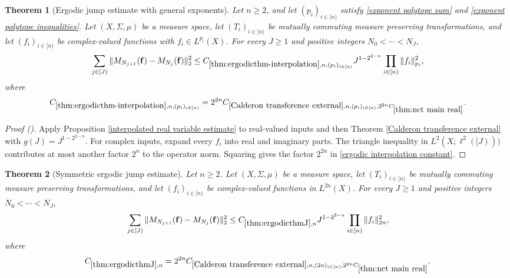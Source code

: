 \documentclass[12pt,reqno]{amsart}
\newcommand{\auto}{{({\tiny\faCar})}}
\theoremstyle{plain}
\newtheorem{theorem}{Theorem}[section]
\numberwithin{equation}{section}
\theoremstyle{remark}
\newcommand{\using}[1]{}
\begin{document}
\begin{theorem}[Ergodic jump estimate with general exponents]\label{thm:ergodicthm-interpolation}\using{interpolated real variable estimate}\using{Calderon transference external}
Let $n\ge2$, and let $(p_i)_{i\in[n)}$ satisfy \eqref{exponent polytope sum} and \eqref{exponent polytope inequalities}. Let $(X,\Sigma,\mu)$ be a measure space, let $(T_i)_{i\in[n)}$ be mutually commuting measure preserving transformations, and let $(f_i)_{i\in[n)}$ be complex-valued functions with $f_i\in L^{p_i}(X)$. For every $J\ge1$ and positive integers $N_0<\cdots<N_J$,
\begin{equation}\label{ergodic jump general exponents}
\sum_{j\in[J)}\|M_{N_{j+1}}(\mathbf f)-M_{N_j}(\mathbf f)\|_2^2
\le C_{\ref{thm:ergodicthm-interpolation},n,(p_i)_{i\in[n)}}J^{1-2^{2-n}}
\prod_{i\in[n)}\|f_i\|_{p_i}^2,
\end{equation}
where
\begin{equation}\label{ergodic interpolation constant}
C_{\ref{thm:ergodicthm-interpolation},n,(p_i)_{i\in[n)}}
=2^{2n}C_{\ref{Calderon transference external},n,(p_i)_{i\in[n)},2^{2n}C_{\ref{thm:nct main real}}}.
\end{equation}
\end{theorem}

\begin{proof}[Proof \auto]
Apply Proposition \ref{interpolated real variable estimate} to real-valued inputs and then Theorem \ref{Calderon transference external} with $g(J)=J^{1-2^{2-n}}$. For complex inputs, expand every $f_i$ into real and imaginary parts. The triangle inequality in $L^2(X;\ell^2([J)))$ contributes at most another factor $2^n$ to the operator norm. Squaring gives the factor $2^{2n}$ in \eqref{ergodic interpolation constant}.
\end{proof}

\begin{theorem}[Symmetric ergodic jump estimate]\label{thm:ergodicthmJ}\using{thm:ergodicthm-interpolation}
Let $n\ge2$. Let $(X,\Sigma,\mu)$ be a measure space, let $(T_i)_{i\in[n)}$ be mutually commuting measure preserving transformations, and let $(f_i)_{i\in[n)}$ be complex-valued functions in $L^{2n}(X)$. For every $J\ge1$ and positive integers $N_0<\cdots<N_J$,
\begin{equation}\label{symmetric ergodic jump estimate}
\sum_{j\in[J)}\|M_{N_{j+1}}(\mathbf f)-M_{N_j}(\mathbf f)\|_2^2
\le C_{\ref{thm:ergodicthmJ},n}J^{1-2^{2-n}}
\prod_{i\in[n)}\|f_i\|_{2n}^2,
\end{equation}
where
\begin{equation}\label{symmetric ergodic jump constant}
C_{\ref{thm:ergodicthmJ},n}
=2^{2n}C_{\ref{Calderon transference external},n,(2n)_{i\in[n)},2^{2n}C_{\ref{thm:nct main real}}}.
\end{equation}
\end{theorem}
\end{document}
